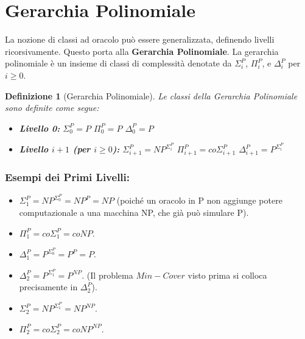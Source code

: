 \documentclass[a4paper]{article}
\newtheorem{definition}{Definizione}
\begin{document}
\section{Gerarchia Polinomiale}
La nozione di classi ad oracolo può essere generalizzata, definendo livelli ricorsivamente. Questo porta alla \textbf{Gerarchia Polinomiale}.
La gerarchia polinomiale è un insieme di classi di complessità denotate da $\Sigma_i^P$, $\Pi_i^P$, e $\Delta_i^P$ per $i \ge 0$.

\begin{definition}[Gerarchia Polinomiale]
Le classi della Gerarchia Polinomiale sono definite come segue:
\begin{itemize}
    \item \textbf{Livello 0:}
    $\Sigma_0^P = P$
    $\Pi_0^P = P$
    $\Delta_0^P = P$
    \item \textbf{Livello $i+1$ (per $i \ge 0$):}
    $\Sigma_{i+1}^P = NP^{\Sigma_i^P}$
    $\Pi_{i+1}^P = co\Sigma_{i+1}^P$
    $\Delta_{i+1}^P = P^{\Sigma_i^P}$
\end{itemize}
\end{definition}

\subsubsection{Esempi dei Primi Livelli:}
\begin{itemize}
    \item $\Sigma_1^P = NP^{\Sigma_0^P} = NP^P = NP$ (poiché un oracolo in P non aggiunge potere computazionale a una macchina NP, che già può simulare P).
    \item $\Pi_1^P = co\Sigma_1^P = coNP$.
    \item $\Delta_1^P = P^{\Sigma_0^P} = P^P = P$.
    \item $\Delta_2^P = P^{\Sigma_1^P} = P^{NP}$. (Il problema $Min-Cover$ visto prima si colloca precisamente in $\Delta_2^P$).
    \item $\Sigma_2^P = NP^{\Sigma_1^P} = NP^{NP}$.
    \item $\Pi_2^P = co\Sigma_2^P = coNP^{NP}$.
\end{itemize}
\end{document}
